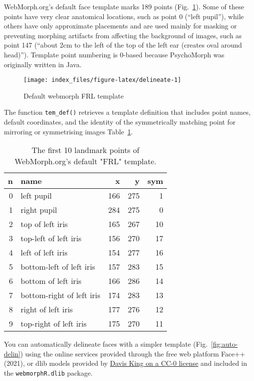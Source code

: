 \documentclass[
  doc,floatsintext]{apa6}
\begin{document}
WebMorph.org's default face template marks 189 points (Fig.~\ref{fig:delineate}). Some of these points have very clear anatomical locations, such as point 0 (``left pupil''), while others have only approximate placements and are used mainly for masking or preventing morphing artifacts from affecting the background of images, such as point 147 (``about 2cm to the left of the top of the left ear (creates oval around head)''). Template point numbering is 0-based because PsychoMorph was originally written in Java.

\begin{figure}
\texttt{[image: index\_files/figure-latex/delineate-1]} \caption{Default webmorph FRL template}\label{fig:delineate}
\end{figure}

The function \texttt{tem\_def()} retrieves a template definition that includes point names, default coordinates, and the identity of the symmetrically matching point for mirroring or symmetrising images Table~\ref{tab:tem-def}.

\begin{table}

\caption{\label{tab:tem-def}The first 10 landmark points of WebMorph.org's default "FRL" template.}
\centering
\begin{tabular}[t]{r|l|r|r|r}
\hline
n & name & x & y & sym\\
\hline
0 & left pupil & 166 & 275 & 1\\
\hline
1 & right pupil & 284 & 275 & 0\\
\hline
2 & top of left iris & 165 & 267 & 10\\
\hline
3 & top-left of left iris & 156 & 270 & 17\\
\hline
4 & left of left iris & 154 & 277 & 16\\
\hline
5 & bottom-left of left iris & 157 & 283 & 15\\
\hline
6 & bottom of left iris & 166 & 286 & 14\\
\hline
7 & bottom-right of left iris & 174 & 283 & 13\\
\hline
8 & right of left iris & 177 & 276 & 12\\
\hline
9 & top-right of left iris & 175 & 270 & 11\\
\hline
\end{tabular}
\end{table}

You can automatically delineate faces with a simpler template (Fig.~\ref{fig:auto-delin}) using the online services provided through the free web platform Face++ (2021), or dlib models provided by \href{https://github.com/davisking/dlib-models}{Davis King on a CC-0 license} and included in the \texttt{webmorphR.dlib} package.
\end{document}
